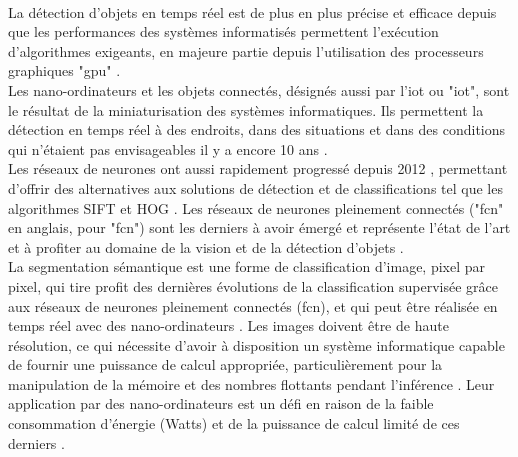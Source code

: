 \vspace{\baselineskip}
\\
\noindent La détection d'objets en temps réel est de plus en plus précise et efficace depuis que les performances des systèmes informatisés permettent l'exécution d'algorithmes exigeants, en majeure partie depuis l'utilisation des processeurs graphiques "\acrshort{gpu}" \parencite{chong_real-time_1992, dettmers_deep_2015, beam_deep_2017, jiaconda_concise_2019, zheng_real-time_2020, kurenkov_brief_2015}. 
\vspace{\baselineskip}
\\
\noindent Les nano-ordinateurs et les objets connectés, désignés aussi par l'\acrlong{iot} ou "\acrshort{iot}", \parencite{blanco-filgueira_deep_2019, sharma_history_2019} sont le résultat de la miniaturisation des systèmes informatiques. Ils permettent la détection en temps réel à des endroits, dans des situations et dans des conditions qui n'étaient pas envisageables il y a encore 10 ans \parencite{zheng_real-time_2020, bernas_edge_2017, abouzahir_iot-empowered_2017, blanco-filgueira_deep_2019}.
\vspace{\baselineskip}
\\
\noindent Les réseaux de neurones ont aussi rapidement progressé depuis 2012 \parencite{beam_deep_2017}, permettant d'offrir des alternatives aux solutions de détection et de classifications tel que les algorithmes SIFT et HOG \parencite{pathak_architecturally_2019}. Les réseaux de neurones pleinement connectés ("\acrshort{fcn}" en anglais, pour "\acrlong{fcn}") sont les derniers à avoir émergé et représente l'état de l'art \parencite{zheng_real-time_2020} et à profiter au domaine de la vision et de la détection d'objets \parencite{nguyen_mavnet_2019, zheng_real-time_2020}.
\vspace{\baselineskip}
\\
\noindent La segmentation sémantique est une forme de classification d'image, pixel par pixel, qui tire profit des dernières évolutions de la classification supervisée grâce aux réseaux de neurones pleinement connectés (\acrshort{fcn}), et qui peut être réalisée en temps réel avec des nano-ordinateurs \parencite{long_fully_2015, blanco-filgueira_deep_2019}. Les images doivent être de haute résolution, ce qui nécessite d'avoir à disposition un système informatique capable de fournir une puissance de calcul appropriée, particulièrement pour la manipulation de la mémoire et des nombres flottants pendant l'inférence \parencite{mody_low_2018}. Leur application par des nano-ordinateurs est un défi en raison de la faible consommation d'énergie (Watts) et de la puissance de calcul limité de ces derniers \parencite{copel_whats_2016}.
